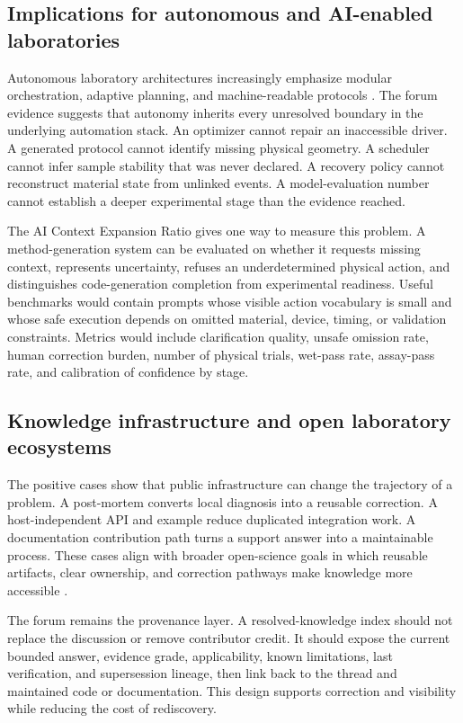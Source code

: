 \subsection{Implications for autonomous and AI-enabled laboratories}

Autonomous laboratory architectures increasingly emphasize modular orchestration, adaptive planning, and machine-readable protocols \cite{hung2024community,canty2023autonomy,fei2024alabos}. The forum evidence suggests that autonomy inherits every unresolved boundary in the underlying automation stack. An optimizer cannot repair an inaccessible driver. A generated protocol cannot identify missing physical geometry. A scheduler cannot infer sample stability that was never declared. A recovery policy cannot reconstruct material state from unlinked events. A model-evaluation number cannot establish a deeper experimental stage than the evidence reached.

The AI Context Expansion Ratio gives one way to measure this problem. A method-generation system can be evaluated on whether it requests missing context, represents uncertainty, refuses an underdetermined physical action, and distinguishes code-generation completion from experimental readiness. Useful benchmarks would contain prompts whose visible action vocabulary is small and whose safe execution depends on omitted material, device, timing, or validation constraints. Metrics would include clarification quality, unsafe omission rate, human correction burden, number of physical trials, wet-pass rate, assay-pass rate, and calibration of confidence by stage.

\subsection{Knowledge infrastructure and open laboratory ecosystems}

The positive cases show that public infrastructure can change the trajectory of a problem. A post-mortem converts local diagnosis into a reusable correction. A host-independent API and example reduce duplicated integration work. A documentation contribution path turns a support answer into a maintainable process. These cases align with broader open-science goals in which reusable artifacts, clear ownership, and correction pathways make knowledge more accessible \cite{wilkinson2016fair,eerland2021communities}.

The forum remains the provenance layer. A resolved-knowledge index should not replace the discussion or remove contributor credit. It should expose the current bounded answer, evidence grade, applicability, known limitations, last verification, and supersession lineage, then link back to the thread and maintained code or documentation. This design supports correction and visibility while reducing the cost of rediscovery.
